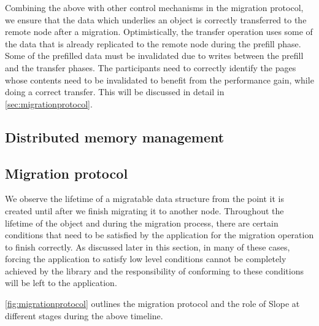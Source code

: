 Combining the above with other control mechanisms in the migration protocol, we
ensure that the data which underlies an object is correctly transferred to the
remote node after a migration. Optimistically, the transfer operation uses some
of the data that is already replicated to the remote node during the prefill
phase. Some of the prefilled data must be invalidated due to writes between the
prefill and the transfer phases. The participants need to correctly identify
the pages whose contents need to be invalidated to benefit from the performance
gain, while doing a correct transfer. This will be discussed in detail in
\autoref{sec:migrationprotocol}.

\subsection{Distributed memory management}

\subsection{Migration protocol}
\label{sec:migrationprotocol}
We observe the lifetime of a migratable data structure from the point it is
created until after we finish migrating it to another node. Throughout the
lifetime of the object and during the migration process, there are certain
conditions that need to be satisfied by the application for the migration
operation to finish correctly. As discussed later in this section,
in many of these cases, forcing the application to satisfy low level conditions
cannot be completely achieved by the library and the responsibility of
conforming to these conditions will be left to the application.

\autoref{fig:migrationprotocol} outlines the migration protocol and the role
of Slope at different stages during the above timeline.

